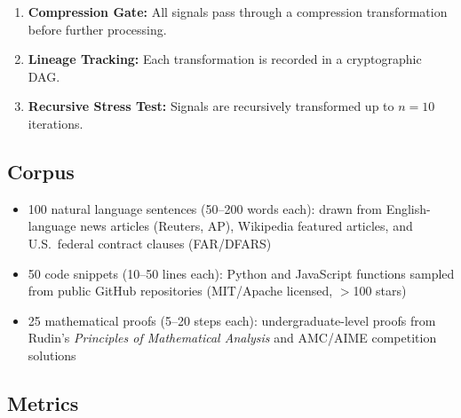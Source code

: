 \documentclass[11pt,a4paper]{article}
\begin{document}
\begin{enumerate}
    \item \textbf{Compression Gate:} All signals pass through a compression transformation before further processing.
    \item \textbf{Lineage Tracking:} Each transformation is recorded in a cryptographic DAG.
    \item \textbf{Recursive Stress Test:} Signals are recursively transformed up to $n = 10$ iterations.
\end{enumerate}

\subsection{Corpus}

\begin{itemize}
    \item 100 natural language sentences (50--200 words each): drawn from English-language news articles (Reuters, AP), Wikipedia featured articles, and U.S.\ federal contract clauses (FAR/DFARS)
    \item 50 code snippets (10--50 lines each): Python and JavaScript functions sampled from public GitHub repositories (MIT/Apache licensed, $>$100 stars)
    \item 25 mathematical proofs (5--20 steps each): undergraduate-level proofs from Rudin's \textit{Principles of Mathematical Analysis} and AMC/AIME competition solutions
\end{itemize}

\subsection{Metrics}
\end{document}
